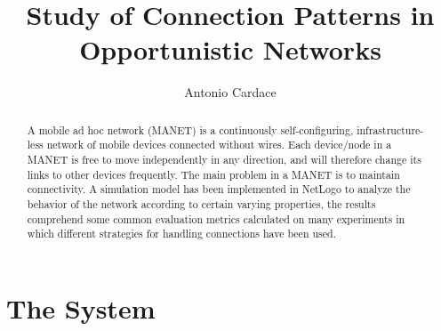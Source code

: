 \documentclass{llncs}
\begin{document}
\mainmatter              %
%
\title{Study of Connection Patterns in Opportunistic Networks}
%
\author{Antonio Cardace}
%
\maketitle
%
\begin{abstract}
A mobile ad hoc network (MANET) is a continuously self-configuring, infrastructure-less network of mobile devices connected without wires. Each   device/node in a MANET is free to move independently in any direction, and   will therefore change its links to other devices frequently. The main problem in a MANET is to maintain connectivity. A simulation model has been implemented in NetLogo to analyze the behavior of the network according to certain varying properties, the results comprehend some common evaluation metrics calculated on many experiments in which different strategies for handling connections have been used.
\end{abstract}

\section{The System}
\end{document}
